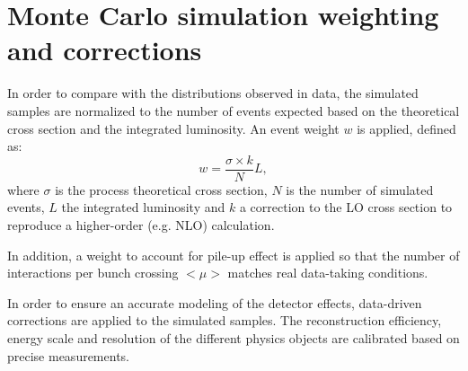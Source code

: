 \section{Monte Carlo simulation weighting and corrections}
\label{sec:mcweights}

In order to compare with the distributions observed in data, the
simulated samples are normalized to the number of events expected
based on the theoretical cross section and the integrated luminosity.
An event weight $w$ is applied, defined as:
\begin{equation}\label{eq:mcweight}
w = \dfrac{\sigma\times k}{N} L,
\end{equation}
where $\sigma$ is the process theoretical cross section, $N$ is the
number of simulated events, $L$ the integrated luminosity and $k$ a
correction to the LO cross section to reproduce a higher-order
(e.g. NLO) calculation.

In addition, a weight to account for pile-up effect is applied so that
the number of interactions per bunch crossing $<\mu>$ matches real
data-taking conditions.

In order to ensure an accurate modeling of the detector effects,
data-driven corrections are applied to the simulated samples.
The reconstruction efficiency, energy scale and resolution of the
different physics objects are calibrated based on precise
measurements. 
